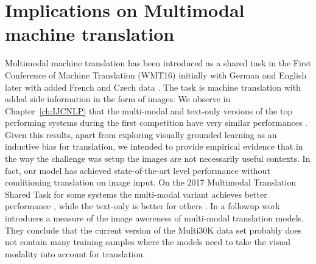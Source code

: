 \section{Implications on Multimodal machine translation}
Multimodal machine translation has been introduced as a shared task \citep{specia2016shared} in the
First Conference of Machine Translation (WMT16) initially with German and English  \citep{elliott2016multi30k}
later with added French and Czech data \citep{elliott2017findings,barrault2018findings}. The task is 
machine translation with added side information in the form of images. 
We observe in Chapter~\ref{ch:IJCNLP} that the multi-modal and text-only versions of 
the top performing systems during the first competition
have very similar performances \citep{specia2016observed}.
Given this results, apart from exploring visually grounded learning as an inductive bias for translation,
we intended to provide empirical evidence that in the way the challenge was setup the images are not
necessarily useful contexts. In fact, our model has achieved state-of-the-art level performance without 
conditioning translation on image input. On the 2017 Multimodal Translation Shared Task for some
systems the multi-modal variant achieves better performance \citep{caglayan2017lium}, while the
text-only is better for others \citep{ma2017osu}. In a followup work \cite{elliott2018adversarial} introduces
a measure of the image awereness of multi-modal translation models. They conclude that the current 
version of the Multi30K data set probably does not contain many training samples where the models 
need to take the visual modality into account for translation.

